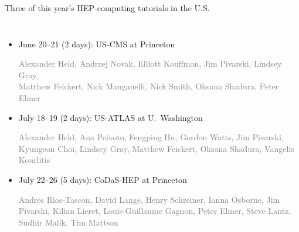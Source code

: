\documentclass[aspectratio=169]{beamer}
\begin{document}
\begin{frame}{Three of this year's HEP-computing tutorials in the U.S.}
\Large
\vspace{0.5 cm}
\begin{columns}
\begin{itemize}\setlength{\itemsep}{0.5 cm}
\item June 20--21 (2 days): US-CMS at Princeton

\textcolor{gray}{\normalsize Alexander Held, Andrzej Novak, Elliott Kauffman, Jim Pivarski, Lindsey Gray, \\ Matthew Feickert, Nick Manganelli, Nick Smith, Oksana Shadura, Peter Elmer}

\item July 18--19 (2 days): US-ATLAS at U.\ Washington

\textcolor{gray}{\normalsize Alexander Held, Ana Peixoto, Fengping Hu, Gordon Watts, Jim Pivarski, \\ Kyungeon Choi, Lindsey Gray, Matthew Feickert, Oksana Shadura, Vangelis Kourlitis}

\item July 22--26 (5 days): CoDaS-HEP at Princeton

\textcolor{gray}{\normalsize Andres Rios-Tascon, David Lange, Henry Schreiner, Ianna Osborne, Jim Pivarski, Kilian Lieret, Louis-Guillaume Gagnon, Peter Elmer, Steve Lantz, Sudhir Malik, Tim Mattson}
\end{itemize}
\end{columns}
\end{frame}
\end{document}
